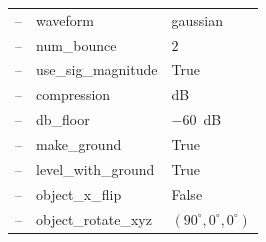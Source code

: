 \documentclass[sensors,article,submit,moreauthors]{Definitions/mdpi}
\begin{document}
\begin{table}[H]
\begin{tabular}{lll}
\multicolumn{1}{c}{--}     & waveform                 & gaussian \\
\multicolumn{1}{c}{--}     & num\_bounce              & $2$ \\
\multicolumn{1}{c}{--}     & use\_sig\_magnitude      & True \\
\multicolumn{1}{c}{--}     & compression              & dB \\
\multicolumn{1}{c}{--}     & db\_floor                & $-60$~dB \\
\multicolumn{1}{c}{--}     & make\_ground             & True \\
\multicolumn{1}{c}{--}     & level\_with\_ground      & True \\
\multicolumn{1}{c}{--}     & object\_x\_flip          & False \\
\multicolumn{1}{c}{--}     & object\_rotate\_xyz      & $(90^\circ, 0^\circ,
0^\circ)$ \\
\bottomrule
\end{tabular}
\end{table}
\end{document}
